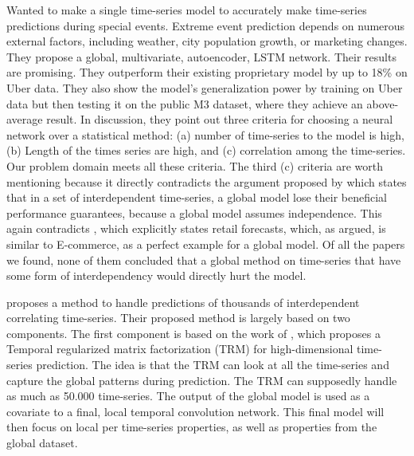 \cite{Laptev}
Wanted to make a single time-series model to
accurately make time-series predictions during special events.
Extreme event prediction depends on numerous external factors, including weather, city population growth, or marketing
changes.
They propose a global, multivariate, autoencoder, LSTM network.
Their results are promising. They outperform their existing
proprietary model by up to 18\% on Uber data.
They also show the model's generalization power by training on Uber data
but then testing it on the public M3 dataset, where they achieve an above-average result.
In \cite{Laptev} discussion, they point out three criteria for
choosing a neural network over a statistical method:
(a) number of time-series to the model is high, (b) Length of the
times series are high, and (c) correlation among the time-series.
Our problem domain meets all these criteria.
The third (c) criteria are worth mentioning because it directly
contradicts the argument proposed by \cite{Montero-Manso2021}%
which states that in a set of interdependent time-series,
a global model lose their beneficial performance guarantees,
because a global model assumes independence.
This again contradicts \cite{Hewamalage2021}, which explicitly states
retail forecasts, which, as argued, is similar to E-commerce,
as a perfect example for a global model.
Of all the papers we found, none of them concluded that a global method
on time-series that have some form of interdependency would directly hurt the model.



\cite{Sen2019} proposes a method to handle predictions of thousands of interdependent correlating time-series.
Their proposed method is largely based on two components. The first component is based on the work of
\cite{Yu}, which proposes a Temporal regularized matrix factorization (TRM) for high-dimensional time-series prediction.
The idea is that the TRM can look at all the time-series and capture the global patterns during prediction.
The TRM can supposedly handle as much as 50.000 time-series.
The output of the global model is used as a covariate to a final, local temporal convolution network. This final model
will then focus on local per time-series properties, as well as properties from the global dataset.



